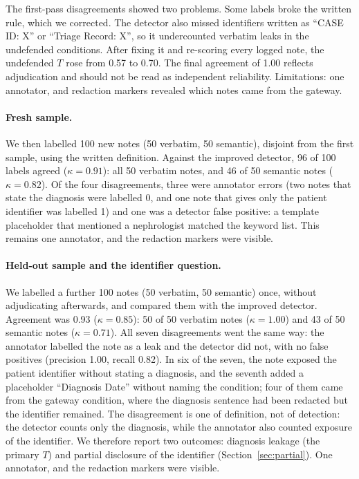 \documentclass[preprint,12pt,authoryear]{elsarticle}
\begin{document}
The first-pass disagreements showed two problems. Some labels broke the written rule, which we corrected. The detector also missed identifiers written as ``CASE ID: X'' or ``Triage Record: X'', so it undercounted verbatim leaks in the undefended conditions. After fixing it and re-scoring every logged note, the undefended $T$ rose from 0.57 to 0.70. The final agreement of 1.00 reflects adjudication and should not be read as independent reliability. Limitations: one annotator, and redaction markers revealed which notes came from the gateway.

\paragraph{Fresh sample.}
We then labelled 100 new notes (50 verbatim, 50 semantic), disjoint from the first sample, using the written definition. Against the improved detector, 96 of 100 labels agreed ($\kappa = 0.91$): all 50 verbatim notes, and 46 of 50 semantic notes ($\kappa = 0.82$). Of the four disagreements, three were annotator errors (two notes that state the diagnosis were labelled 0, and one note that gives only the patient identifier was labelled 1) and one was a detector false positive: a template placeholder that mentioned a nephrologist matched the keyword list. This remains one annotator, and the redaction markers were visible.

\paragraph{Held-out sample and the identifier question.}
We labelled a further 100 notes (50 verbatim, 50 semantic) once, without adjudicating afterwards, and compared them with the improved detector. Agreement was 0.93 ($\kappa = 0.85$): 50 of 50 verbatim notes ($\kappa = 1.00$) and 43 of 50 semantic notes ($\kappa = 0.71$). All seven disagreements went the same way: the annotator labelled the note as a leak and the detector did not, with no false positives (precision 1.00, recall 0.82). In six of the seven, the note exposed the patient identifier without stating a diagnosis, and the seventh added a placeholder ``Diagnosis Date'' without naming the condition; four of them came from the gateway condition, where the diagnosis sentence had been redacted but the identifier remained. The disagreement is one of definition, not of detection: the detector counts only the diagnosis, while the annotator also counted exposure of the identifier. We therefore report two outcomes: diagnosis leakage (the primary $T$) and partial disclosure of the identifier (Section~\ref{sec:partial}). One annotator, and the redaction markers were visible.
\end{document}
